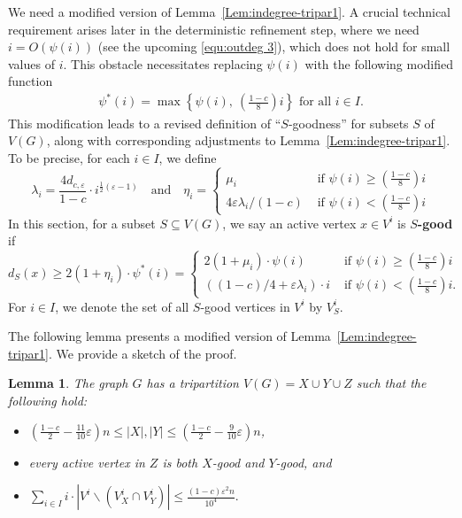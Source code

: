 \documentclass{aic}
\newtheorem{lemma}[dfn]{Lemma}
\newcommand{\lt}{\left}
\newcommand{\rt}{\right}
\begin{document}
	We need a modified version of Lemma~\ref{Lem:indegree-tripar1}.
	A crucial technical requirement arises later in the deterministic refinement step,
	where we need $i = O(\psi(i))$ (see the upcoming \eqref{equ:outdeg 3}), which does not hold for small values of $i$.
	This obstacle necessitates replacing $\psi(i)$ with the following modified function
	\begin{align}\label{equ:phi*}
		\psi^*(i)=\max\left\{\psi(i),~\left(\frac{1-c}{8}\right)i\right\} \mbox{ for all } i\in I.
	\end{align}
	This modification leads to a revised definition of ``$S$-goodness'' for subsets $S$ of $V(G)$, along with corresponding adjustments to Lemma~\ref{Lem:indegree-tripar1}.
	To be precise, for each $i\in I$, we define
	\begin{equation}\label{equ:eta}
		\lambda_i=\frac{4d_{c,\varepsilon}}{1-c}\cdot i^{\frac{1}{2}(\varepsilon-1)}
		\mbox{ ~ and ~ }
		\eta_i=\lt\{\begin{array}{ll}
			\mu_i & \text{ if } \psi(i)\geq \left(\frac{1-c}{8}\right)i \\
			4\varepsilon\lambda_i/(1-c) & \text{ if } \psi(i)< \left(\frac{1-c}{8}\right)i
		\end{array}\rt.
	\end{equation}
	In this section, for a subset $S\subseteq V(G)$,
	we say an active vertex $x\in V^i$ is {\bf $S$-good} if
	\begin{equation}\label{def:outdegree S-good}
		d_S(x)\geq 2(1+\eta_i)\cdot \psi^*(i)=\lt\{\begin{array}{ll}
			2(1+\mu_i)\cdot\psi(i) & \text{ if } \psi(i)\geq \left(\frac{1-c}{8}\right)i \\
			((1-c)/4+\varepsilon\lambda_i)\cdot i & \text{ if } \psi(i)< \left(\frac{1-c}{8}\right)i.
		\end{array}\rt.
	\end{equation}
	For $i\in I$, we denote the set of all $S$-good vertices in $V^i$ by $V^i_S$.
	
	The following lemma presents a modified version of Lemma~\ref{Lem:indegree-tripar1}.
	We provide a sketch of the proof.
	
	\begin{lemma}\label{Lem:outdegree-tripar}
		The graph $G$ has a tripartition $V(G)=X\cup Y\cup Z$ such that the following hold:
		\begin{itemize}
			\item [(a)] $(\frac{1-c}{2}-\frac{11}{10}\varepsilon)n\le |X|,|Y|\le (\frac{1-c}{2}-\frac{9}{10}\varepsilon)n$,
			\item [(b)]  every active vertex in $Z$ is both $X$-good and $Y$-good, and
			\item [(c)] $\sum_{i\in I} i\cdot |V^i\backslash (V^i_X\cap V^i_Y)|\leq \frac{(1-c)\varepsilon^2n}{10^4}.$
		\end{itemize}
	\end{lemma}
	
\end{document}
